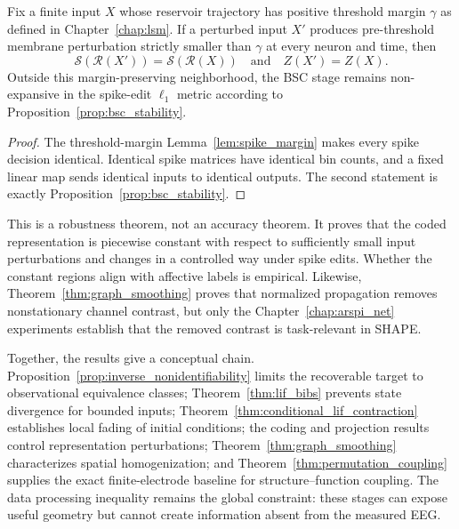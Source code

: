 \begin{theorem}
\label{thm:pipeline_local_robustness}
Fix a finite input $X$ whose reservoir trajectory has positive threshold margin
$\gamma$ as defined in Chapter~\ref{chap:lsm}. If a perturbed input $X'$ produces
pre-threshold membrane perturbation strictly smaller than $\gamma$ at every
neuron and time, then
\begin{equation}
\mathcal{S}(\mathcal{R}(X'))=\mathcal{S}(\mathcal{R}(X))
\quad\text{and}\quad Z(X')=Z(X).
\end{equation}
Outside this margin-preserving neighborhood, the BSC stage remains
non-expansive in the spike-edit $\ell_1$ metric according to
Proposition~\ref{prop:bsc_stability}.
\end{theorem}

\begin{proof}
The threshold-margin Lemma~\ref{lem:spike_margin} makes every spike decision
identical. Identical spike matrices have identical bin counts, and a fixed linear
map sends identical inputs to identical outputs. The second statement is exactly
Proposition~\ref{prop:bsc_stability}.
\end{proof}

This is a robustness theorem, not an accuracy theorem. It proves that the coded
representation is piecewise constant with respect to sufficiently small input
perturbations and changes in a controlled way under spike edits. Whether the
constant regions align with affective labels is empirical. Likewise,
Theorem~\ref{thm:graph_smoothing} proves that normalized propagation removes
nonstationary channel contrast, but only the Chapter~\ref{chap:arspi_net}
experiments establish that the removed contrast is task-relevant in SHAPE.

Together, the results give a conceptual chain. Proposition~\ref{prop:inverse_nonidentifiability}
limits the recoverable target to observational equivalence classes;
Theorem~\ref{thm:lif_bibs} prevents state divergence for bounded inputs;
Theorem~\ref{thm:conditional_lif_contraction} establishes local fading of initial
conditions; the coding and projection results control representation
perturbations; Theorem~\ref{thm:graph_smoothing} characterizes spatial
homogenization; and Theorem~\ref{thm:permutation_coupling} supplies the exact
finite-electrode baseline for structure--function coupling. The data processing
inequality remains the global constraint: these stages can expose useful geometry
but cannot create information absent from the measured EEG.


